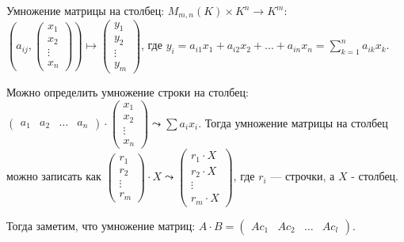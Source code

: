 \begin{definition}
    Умножение матрицы на столбец: $M_{m, n}(K) \times K^n \to K^m$: $(a_{ij}, \begin{pmatrix} x_1 \\ x_2 \\ \vdots \\ x_n \end{pmatrix}) \mapsto \begin{pmatrix} y_1 \\ y_2 \\ \vdots \\ y_m \end{pmatrix}$, где $y_i = a_{i 1} x_1 + a_{i 2}x_2 + \ldots + a_{in}x_n = \sum\limits_{k=1}^n a_{ik}x_k$.

    Можно определить умножение строки на столбец:  $\begin{pmatrix} a_1 & a_2 & \ldots & a_n \end{pmatrix} \cdot \begin{pmatrix} x_1 \\ x_2 \\ \vdots \\ x_n\end{pmatrix} \leadsto \sum a_i x_i$.  Тогда умножение матрицы на столбец можно записать как $\begin{pmatrix} r_1 \\ r_2 \\ \vdots \\ r_m \end{pmatrix} \cdot X \leadsto \begin{pmatrix} r_1 \cdot X \\ r_2 \cdot X \\ \vdots \\ r_m \cdot X \end{pmatrix}$, где $r_i$ --- строчки, а $X$ - столбец.

     Тогда заметим, что умножение матриц: $A \cdot B = \begin{pmatrix} Ac_1 & Ac_2 & \ldots  & Ac_l \end{pmatrix}$.
\end{definition}
